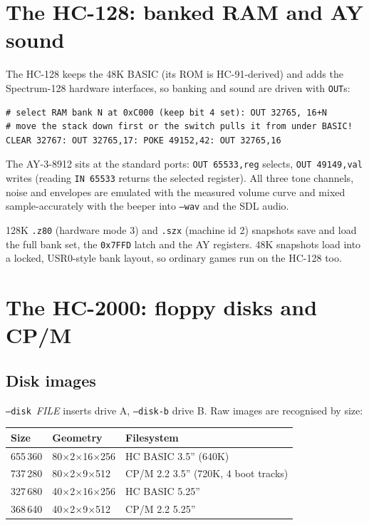 \documentclass[11pt,a4paper]{article}
\newcommand{\opt}[1]{\texttt{#1}}
\begin{document}
\section{The HC-128: banked RAM and AY sound}

The HC-128 keeps the 48K BASIC (its ROM is HC-91-derived) and adds the
Spectrum-128 hardware interfaces, so banking and sound are driven with
\texttt{OUT}s:

\begin{Verbatim}
# select RAM bank N at 0xC000 (keep bit 4 set): OUT 32765, 16+N
# move the stack down first or the switch pulls it from under BASIC!
CLEAR 32767: OUT 32765,17: POKE 49152,42: OUT 32765,16
\end{Verbatim}

The AY-3-8912 sits at the standard ports: \texttt{OUT 65533,reg}
selects, \texttt{OUT 49149,val} writes (reading \texttt{IN 65533}
returns the selected register). All three tone channels, noise and
envelopes are emulated with the measured volume curve and mixed
sample-accurately with the beeper into \opt{--wav} and the SDL audio.

128K \texttt{.z80} (hardware mode 3) and \texttt{.szx} (machine id 2)
snapshots save and load the full bank set, the \texttt{0x7FFD} latch
and the AY registers. 48K snapshots load into a locked, USR0-style
bank layout, so ordinary games run on the HC-128 too.

\section{The HC-2000: floppy disks and CP/M}
\label{sec:disk}

\subsection{Disk images}

\opt{--disk}~\textit{FILE} inserts drive A, \opt{--disk-b} drive B.
Raw images are recognised by size:

\begin{tabularx}{\textwidth}{llX}
\toprule
\textbf{Size} & \textbf{Geometry} & \textbf{Filesystem} \\
\midrule
655\,360 & 80$\times$2$\times$16$\times$256 & HC BASIC 3.5'' (640K) \\
737\,280 & 80$\times$2$\times$9$\times$512 & CP/M 2.2 3.5'' (720K, 4 boot tracks) \\
327\,680 & 40$\times$2$\times$16$\times$256 & HC BASIC 5.25'' \\
368\,640 & 40$\times$2$\times$9$\times$512 & CP/M 2.2 5.25'' \\
\bottomrule
\end{tabularx}
\end{document}
